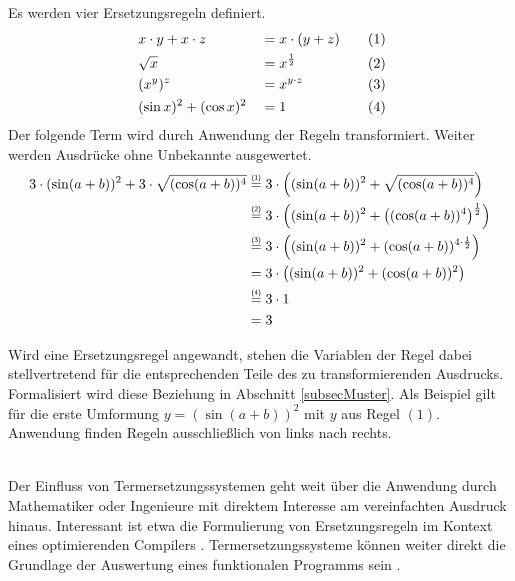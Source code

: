 \begin{beispiel}
Es werden vier Ersetzungsregeln definiert.
\begin{alignat*}{4}
    ~& x \cdot y + x \cdot z   & &= x \cdot (y + z) &~~~& (1) \\
    ~& \sqrt{x}                & &= x^{\frac 1 2}   &~~~& (2) \\
    ~& (x^y)^z           & &= x^{y \cdot z}   &~~~& (3) \\
    ~& (\sin x)^2 + (\cos x)^2 & &= 1               &~~~& (4)
\end{alignat*}
Der folgende Term wird durch Anwendung der Regeln transformiert. 
 Weiter werden Ausdrücke ohne Unbekannte ausgewertet.
\begin{equation*}
    \begin{split}
    3 \cdot (\sin(a + b))^2 + 3 \cdot \sqrt{(\cos(a + b))^4}
	&\stapel = {(1)} 3 \cdot \paren*{(\sin(a + b))^2 + \sqrt{(\cos(a + b))^4}} \\
	&\stapel = {(2)} 3 \cdot \paren*{(\sin(a + b))^2 + \paren*{{(\cos(a + b))^4}}^{\frac 1 2}}\\
	&\stapel = {(3)} 3 \cdot \paren*{(\sin(a + b))^2 + {(\cos(a + b))^{4 \cdot \frac 1 2}}}\\
	& =              3 \cdot \paren*{(\sin(a + b))^2 + {(\cos(a + b))^2}}\\
	&\stapel = {(4)} 3 \cdot 1\\
    & = 3
    \end{split}
\end{equation*}

Wird eine Ersetzungsregel angewandt, stehen die Variablen der Regel dabei stellvertretend für die entsprechenden Teile des zu transformierenden Ausdrucks.
 Formalisiert wird diese Beziehung in Abschnitt \ref{subsecMuster}. Als Beispiel gilt für die erste Umformung $y = (\sin(a + b))^2$ mit $y$ aus Regel $(1)$. Anwendung finden Regeln ausschließlich von links nach rechts.
\end{beispiel}

~\\
Der Einfluss von Termersetzungssystemen geht weit über die Anwendung durch Mathematiker oder Ingenieure mit direktem Interesse am vereinfachten Ausdruck hinaus. Interessant ist etwa die Formulierung von Ersetzungsregeln im Kontext eines optimierenden Compilers \cite{HaskellCustomRewriteRules, HaskellCoreOptimizer}. Termersetzungssysteme können weiter direkt die Grundlage der Auswertung eines funktionalen Programms sein \cite{Jones1987JanRewritingMiranda}.


